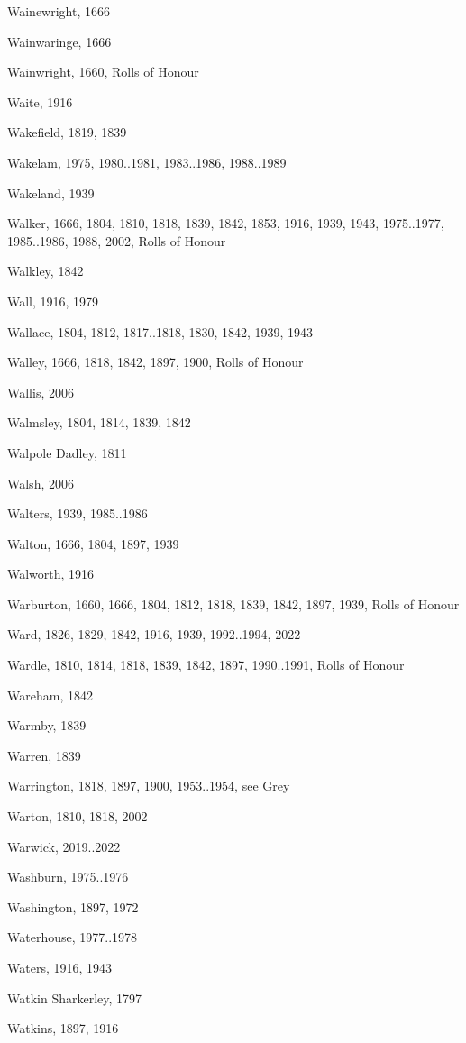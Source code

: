 {\begin{theindex}
\item Wainewright, 1666
\item Wainwaringe, 1666
\item Wainwright, 1660, Rolls of Honour
\item Waite, 1916
\item Wakefield, 1819, 1839
\item Wakelam, 1975, 1980..1981, 1983..1986, 1988..1989
\item Wakeland, 1939
\item Walker, 1666, 1804, 1810, 1818, 1839, 1842, 1853, 1916, 1939, 1943, 1975..1977, 1985..1986, 1988, 2002, Rolls of Honour
\item Walkley, 1842
\item Wall, 1916, 1979
\item Wallace, 1804, 1812, 1817..1818, 1830, 1842, 1939, 1943
\item Walley, 1666, 1818, 1842, 1897, 1900, Rolls of Honour
\item Wallis, 2006
\item Walmsley, 1804, 1814, 1839, 1842
\item Walpole Dadley, 1811
\item Walsh, 2006
\item Walters, 1939, 1985..1986
\item Walton, 1666, 1804, 1897, 1939
\item Walworth, 1916
\item Warburton, 1660, 1666, 1804, 1812, 1818, 1839, 1842, 1897, 1939, Rolls of Honour
\item Ward, 1826, 1829, 1842, 1916, 1939, 1992..1994, 2022
\item Wardle, 1810, 1814, 1818, 1839, 1842, 1897, 1990..1991, Rolls of Honour
\item Wareham, 1842
\item Warmby, 1839
\item Warren, 1839
\item Warrington, 1818, 1897, 1900, 1953..1954, see Grey
\item Warton, 1810, 1818, 2002
\item Warwick, 2019..2022
\item Washburn, 1975..1976
\item Washington, 1897, 1972
\item Waterhouse, 1977..1978
\item Waters, 1916, 1943
\item Watkin Sharkerley, 1797
\item Watkins, 1897, 1916

\end{theindex}}
